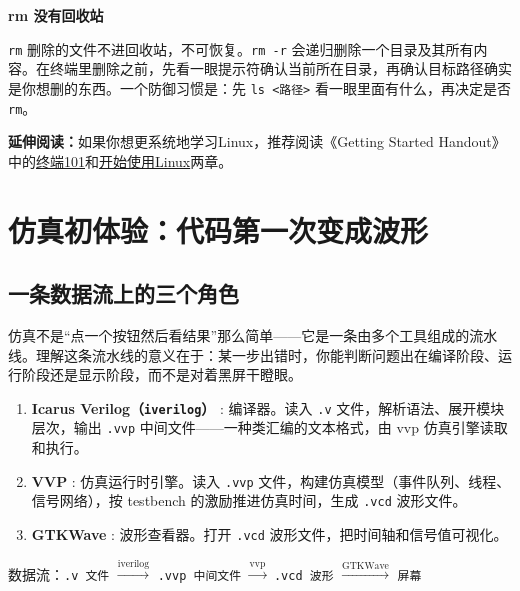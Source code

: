 \documentclass[11pt,a4paper]{article}
\begin{document}
\begin{warnbox}
\textbf{rm 没有回收站}

\texttt{rm} 删除的文件不进回收站，不可恢复。\texttt{rm -r} 会递归删除一个目录及其所有内容。在终端里删除之前，先看一眼提示符确认当前所在目录，再确认目标路径确实是你想删的东西。一个防御习惯是：先 \texttt{ls <路径>} 看一眼里面有什么，再决定是否 \texttt{rm}。
\end{warnbox}

\begin{tipbox}
\textbf{延伸阅读：}如果你想更系统地学习Linux，推荐阅读《Getting Started Handout》中的\href{https://github.com/ZangXuanyi/getting-started-handout/blob/main/book3/01-shell-101.tex}{终端101}和\href{https://github.com/ZangXuanyi/getting-started-handout/blob/main/book3/02-linux.tex}{开始使用Linux}两章。
\end{tipbox}

\section{仿真初体验：代码第一次变成波形}

\subsection{一条数据流上的三个角色}

仿真不是``点一个按钮然后看结果''那么简单——它是一条由多个工具组成的流水线。理解这条流水线的意义在于：某一步出错时，你能判断问题出在编译阶段、运行阶段还是显示阶段，而不是对着黑屏干瞪眼。

\begin{enumerate}
  \item \textbf{Icarus Verilog（\texttt{iverilog}）} : 编译器。读入 \texttt{.v} 文件，解析语法、展开模块层次，输出 \texttt{.vvp} 中间文件——一种类汇编的文本格式，由 vvp 仿真引擎读取和执行。
  \item \textbf{VVP} : 仿真运行时引擎。读入 \texttt{.vvp} 文件，构建仿真模型（事件队列、线程、信号网络），按 testbench 的激励推进仿真时间，生成 \texttt{.vcd} 波形文件。
  \item \textbf{GTKWave} : 波形查看器。打开 \texttt{.vcd} 波形文件，把时间轴和信号值可视化。
\end{enumerate}

数据流：\texttt{.v 文件} $\xrightarrow{\text{iverilog}}$ \texttt{.vvp 中间文件} $\xrightarrow{\text{vvp}}$ \texttt{.vcd 波形} $\xrightarrow{\text{GTKWave}}$ \texttt{屏幕}
\end{document}
